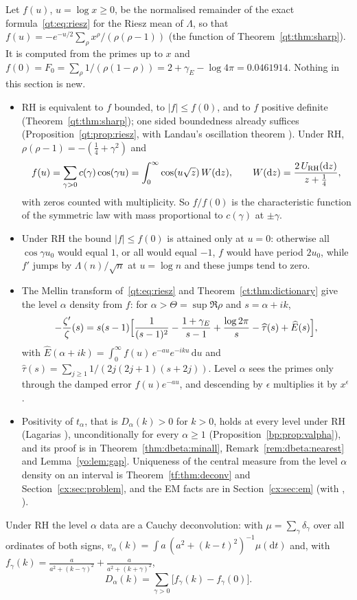 Let $f(u)$, $u=\log x\ge0$, be the normalised remainder of the exact formula~\eqref{qt:eq:riesz} for the Riesz mean of $\Lambda$, so that $f(u)=-e^{-u/2}\sum_\rho x^{\rho}/(\rho(\rho-1))$ (the function of Theorem~\ref{qt:thm:sharp}). It is computed from the primes up to $x$ and $f(0)=F_0=\sum_\rho1/(\rho(1-\rho))=2+\gamma_E-\log4\pi=0.0461914$. Nothing in this section is new.
\begin{itemize}
\item RH is equivalent to $f$ bounded, to $|f|\le f(0)$, and to $f$ positive definite (Theorem~\ref{qt:thm:sharp}); one sided boundedness already suffices (Proposition~\ref{qt:prop:riesz}, with Landau's oscillation theorem \cite{Landau05}). Under RH, $\rho(\rho-1)=-(\frac14+\gamma^2)$ and
\begin{equation}\label{xf:eq:cos}
f(u)=\sum_{\gamma>0}c(\gamma)\cos(\gamma u)=\int_0^\infty\cos(u\sqrt z)\,W(\mathrm dz),\qquad W(\mathrm dz)=\frac{2\,U_{\rm RH}(\mathrm dz)}{z+\frac14},
\end{equation}
with zeros counted with multiplicity. So $f/f(0)$ is the characteristic function of the symmetric law with mass proportional to $c(\gamma)$ at $\pm\gamma$.
\item Under RH the bound $|f|\le f(0)$ is attained only at $u=0$: otherwise all $\cos\gamma u_0$ would equal $1$, or all would equal $-1$, $f$ would have period $2u_0$, while $f'$ jumps by $\Lambda(n)/\sqrt n$ at $u=\log n$ and these jumps tend to zero.
\item The Mellin transform of~\eqref{qt:eq:riesz} and Theorem~\ref{ct:thm:dictionary} give the level $\alpha$ density from $f$: for $\alpha>\Theta=\sup\Re\rho$ and $s=\alpha+ik$,
\begin{equation}\label{xf:eq:level}
-\frac{\zeta'}{\zeta}(s)=s(s-1)\Bigl[\frac1{(s-1)^2}-\frac{1+\gamma_E}{s-1}+\frac{\log2\pi}{s}-\widehat\tau(s)+\widehat E(s)\Bigr],
\end{equation}
with $\widehat E(\alpha+ik)=\int_0^\infty f(u)\,e^{-au}e^{-iku}\,\mathrm du$ and $\widehat\tau(s)=\sum_{j\ge1}1/(2j(2j+1)(s+2j))$. Level $\alpha$ sees the primes only through the damped error $f(u)e^{-au}$, and descending by $\epsilon$ multiplies it by $x^{\epsilon}$.
\item Positivity of $t_\alpha$, that is $D_\alpha(k)>0$ for $k>0$, holds at every level under RH (Lagarias \cite{Lagarias}), unconditionally for every $\alpha\ge1$ (Proposition~\ref{bp:prop:valpha}), and its proof is in Theorem~\ref{thm:dbeta:minall}, Remark~\ref{rem:dbeta:nearest} and Lemma~\ref{yo:lem:gap}. Uniqueness of the central measure from the level $\alpha$ density on an interval is Theorem~\ref{tf:thm:deconv} and Section~\ref{cx:sec:problem}, and the EM facts are in Section~\ref{cx:sec:em} (with \cite{CT84}, \cite{VSK85}).
\end{itemize}
Under RH the level $\alpha$ data are a Cauchy deconvolution: with $\mu=\sum_\gamma\delta_\gamma$ over all ordinates of both signs, $v_\alpha(k)=\int a\,(a^2+(k-t)^2)^{-1}\mu(\mathrm dt)$ and, with $f_\gamma(k)=\frac a{a^2+(k-\gamma)^2}+\frac a{a^2+(k+\gamma)^2}$,
\begin{equation}\label{xf:eq:Dsum}
D_\alpha(k)=\sum_{\gamma>0}\bigl[f_\gamma(k)-f_\gamma(0)\bigr].
\end{equation}

